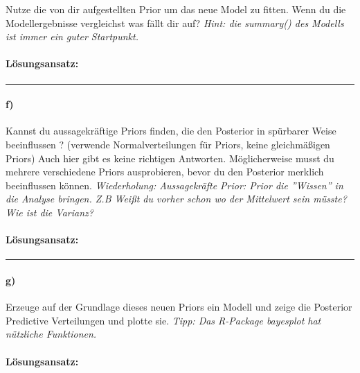 \documentclass[
]{article}
\begin{document}
Nutze die von dir aufgestellten Prior um das neue Model zu fitten. Wenn
du die Modellergebnisse vergleichst was fällt dir auf?
\textit{Hint: die summary() des Modells ist immer ein guter Startpunkt.}

\hypertarget{luxf6sungsansatz-4}{%
\paragraph{Lösungsansatz:}\label{luxf6sungsansatz-4}}

\begin{center}\rule{0.5\linewidth}{0.5pt}\end{center}

\hypertarget{f}{%
\paragraph{f)}\label{f}}

Kannst du aussagekräftige Priors finden, die den Posterior in spürbarer
Weise beeinflussen ? (verwende Normalverteilungen für Priors, keine
gleichmäßigen Priors) Auch hier gibt es keine richtigen Antworten.
Möglicherweise musst du mehrere verschiedene Priors ausprobieren, bevor
du den Posterior merklich beeinflussen können.
\textit{Wiederholung: Aussagekräfte Prior: Prior die ''Wissen'' in die Analyse bringen. Z.B Weißt du vorher schon wo der Mittelwert sein müsste? Wie ist die Varianz?}

\hypertarget{luxf6sungsansatz-5}{%
\paragraph{Lösungsansatz:}\label{luxf6sungsansatz-5}}

\begin{center}\rule{0.5\linewidth}{0.5pt}\end{center}

\hypertarget{g}{%
\paragraph{g)}\label{g}}

Erzeuge auf der Grundlage dieses neuen Priors ein Modell und zeige die
Posterior Predictive Verteilungen und plotte sie.
\textit{Tipp: Das R-Package bayesplot hat nützliche Funktionen.}

\hypertarget{luxf6sungsansatz-6}{%
\paragraph{Lösungsansatz:}\label{luxf6sungsansatz-6}}
\end{document}
